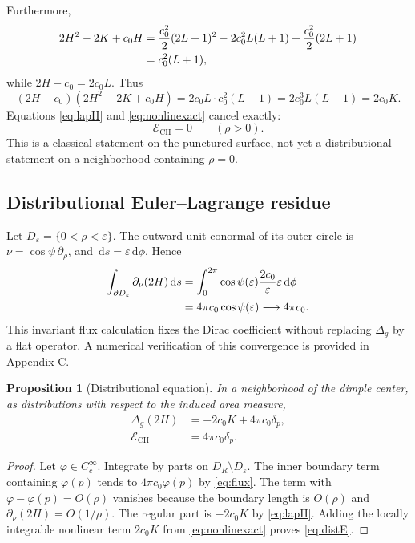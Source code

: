 \documentclass[preprint,amsmath,amssymb,aps,prl,superscriptaddress,nofootinbib,floatfix]{revtex4-2}
\newtheorem{proposition}[theorem]{Proposition}
\newcommand{\dd}{\,\mathrm d}
\newcommand{\E}{\mathcal E}
\newcommand{\CH}{\mathrm{CH}}
\begin{document}
Furthermore,
\begin{align}
2H^2-2K+c_0H
&=\frac{c_0^2}{2}(2L+1)^2-2c_0^2L(L+1)+\frac{c_0^2}{2}(2L+1)\notag\\
&=c_0^2(L+1),\label{eq:nonlinfactor}
\end{align}
while \(2H-c_0=2c_0L\). Thus
\begin{equation}
(2H-c_0)(2H^2-2K+c_0H)=2c_0L\cdot c_0^2(L+1)=2c_0^3L(L+1)=2c_0K.\label{eq:nonlinexact}
\end{equation}
Equations \eqref{eq:lapH} and \eqref{eq:nonlinexact} cancel exactly:
\begin{equation}
\E_{\CH}=0\qquad(\rho>0).\label{eq:punctured}
\end{equation}
This is a classical statement on the punctured surface, not yet a distributional statement on a neighborhood containing \(\rho=0\).

\subsection{Distributional Euler--Lagrange residue}\label{sec:residue}
Let \(D_\varepsilon=\{0<\rho<\varepsilon\}\). The outward unit conormal of its outer circle is \(\nu=\cos\psi\,\partial_\rho\), and \(\dd s=\varepsilon\dd\phi\). Hence
\begin{align}
\int_{\partial D_\varepsilon}\partial_\nu(2H)\dd s
&=\int_0^{2\pi}\cos\psi(\varepsilon)\frac{2c_0}{\varepsilon}\varepsilon\dd\phi\notag\\
&=4\pi c_0\cos\psi(\varepsilon)\longrightarrow4\pi c_0.\label{eq:flux}
\end{align}
This invariant flux calculation fixes the Dirac coefficient without replacing \(\Delta_g\) by a flat operator. A numerical verification of this convergence is provided in Appendix C.

\begin{proposition}[Distributional equation]\label{prop:distribution}
In a neighborhood of the dimple center, as distributions with respect to the induced area measure,
\begin{align}
\Delta_g(2H)&=-2c_0K+4\pi c_0\delta_p,\label{eq:distlap}\\
\E_{\CH}&=4\pi c_0\delta_p.\label{eq:distE}
\end{align}
\end{proposition}
\begin{proof}
Let \(\varphi\in C_c^\infty\). Integrate by parts on \(D_R\setminus D_\varepsilon\). The inner boundary term containing \(\varphi(p)\) tends to \(4\pi c_0\varphi(p)\) by \eqref{eq:flux}. The term with \(\varphi-\varphi(p)=O(\rho)\) vanishes because the boundary length is \(O(\rho)\) and \(\partial_\nu(2H)=O(1/\rho)\). The regular part is \(-2c_0K\) by \eqref{eq:lapH}. Adding the locally integrable nonlinear term \(2c_0K\) from \eqref{eq:nonlinexact} proves \eqref{eq:distE}.
\end{proof}
\end{document}

